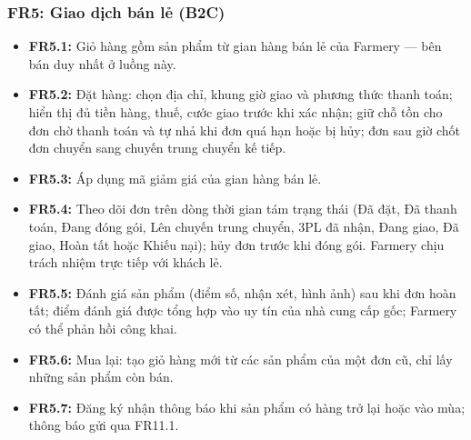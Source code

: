 \subsubsection*{FR5: Giao dịch bán lẻ (B2C)}
\begin{itemize}
    \item \textbf{FR5.1:} Giỏ hàng gồm sản phẩm từ gian hàng bán lẻ của
    Farmery --- bên bán duy nhất ở luồng này.
    \item \textbf{FR5.2:} Đặt hàng: chọn địa chỉ, khung giờ giao và phương
    thức thanh toán; hiển thị đủ tiền hàng, thuế, cước giao trước khi xác nhận;
    giữ chỗ tồn cho đơn chờ thanh toán và tự nhả khi đơn quá hạn hoặc bị hủy;
    đơn sau giờ chốt đơn chuyển sang chuyến trung chuyển kế tiếp.
    \item \textbf{FR5.3:} Áp dụng mã giảm giá của gian hàng bán lẻ.
    \item \textbf{FR5.4:} Theo dõi đơn trên dòng thời gian tám trạng thái
    (Đã đặt, Đã thanh toán, Đang đóng gói, Lên chuyến trung chuyển, 3PL đã
    nhận, Đang giao, Đã giao, Hoàn tất hoặc Khiếu nại); hủy đơn trước khi đóng
    gói. Farmery chịu trách nhiệm trực tiếp với khách lẻ.
    \item \textbf{FR5.5:} Đánh giá sản phẩm (điểm số, nhận xét, hình ảnh)
    sau khi đơn hoàn tất; điểm đánh giá được tổng hợp vào uy tín của nhà cung
    cấp gốc; Farmery có thể phản hồi công khai.
    \item \textbf{FR5.6:} Mua lại: tạo giỏ hàng mới từ các sản phẩm của một
    đơn cũ, chỉ lấy những sản phẩm còn bán.
    \item \textbf{FR5.7:} Đăng ký nhận thông báo khi sản phẩm có hàng trở lại
    hoặc vào mùa; thông báo gửi qua FR11.1.
\end{itemize}

